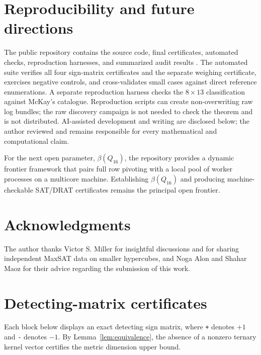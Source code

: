 \documentclass[11pt]{article}
\theoremstyle{plain}
\theoremstyle{definition}
\begin{document}
\section{Reproducibility and future directions}\label{sec:conclusion}

The public repository contains the source code, final certificates, automated checks, reproduction harnesses, and summarized audit results \cite{artifact}. The automated suite verifies all four sign-matrix certificates and the separate weighing certificate, exercises negative controls, and cross-validates small cases against direct reference enumerations. A separate reproduction harness checks the $8\times13$ classification against McKay's catalogue. Reproduction scripts can create non-overwriting raw log bundles; the raw discovery campaign is not needed to check the theorem and is not distributed. AI-assisted development and writing are disclosed below; the author reviewed and remains responsible for every mathematical and computational claim.

For the next open parameter, $\beta(Q_{16})$, the repository provides a dynamic frontier framework that pairs full row pivoting with a local pool of worker processes on a multicore machine. Establishing $\beta(Q_{16})$ and producing machine-checkable SAT/DRAT certificates remains the principal open frontier.

\section*{Acknowledgments}
The author thanks Victor S. Miller for insightful discussions and for sharing independent MaxSAT data on smaller hypercubes, and Noga Alon and Shahar Maoz for their advice regarding the submission of this work.

\appendix
\section{Detecting-matrix certificates}\label{app:certificates}

Each block below displays an exact detecting sign matrix, where \texttt{+} denotes $+1$ and \texttt{-} denotes $-1$. By Lemma~\ref{lem:equivalence}, the absence of a nonzero ternary kernel vector certifies the metric dimension upper bound.
\end{document}
